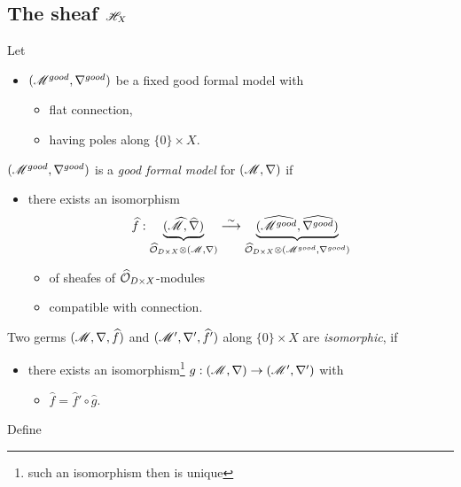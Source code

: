 \subsection{The sheaf $\mathscr{H}_X$}
\begin{defn}
  Let
  \begin{itemize}
    \item $(\mathscr{M}^{good},\nabla^{good})$ be a fixed good formal model with
      \begin{itemize}
        \item flat connection,
        \item having poles along $\{0\}\times X$.
      \end{itemize}
  \end{itemize}
  \begin{defn}
    $(\mathscr{M}^{good},\nabla^{good})$ is a \emph{good formal model} for
    $(\mathscr{M},\nabla)$ if
    \begin{itemize}
      \item there exists an isomorphism
        \[
          \widehat f:
          \underset{\widehat{\mathcal{O}}_{D\times X}\otimes(\mathscr{M},\nabla)}
          {\underbrace{(\widehat{\mathscr{M}},\widehat\nabla)}}
          \overset{\sim}{\longrightarrow}
          \underset{\widehat{\mathcal{O}}_{D\times X}\otimes(\mathscr{M}^{good},\nabla^{good})}
          {\underbrace{(\widehat{\mathscr{M}^{good}},\widehat{\nabla^{good}})}}
        \]
        \begin{itemize}
          \item of sheafes of $\widehat{\mathcal{O}}_{D\times X}$-modules
          \item compatible with connection.
        \end{itemize}
    \end{itemize}
  \end{defn}
  \begin{defn}
    Two germs $(\mathscr{M},\nabla,\widehat f)$ and $(\mathscr{M}',\nabla',\widehat f')$ along
    $\{0\}\times X$ are \emph{isomorphic}, if
    \begin{itemize}
      \item there exists an isomorphism\footnote{such an isomorphism then is
        unique} $g:(\mathscr{M},\nabla)\to(\mathscr{M}',\nabla')$ with
        \begin{itemize}
          \item $\hat f=\hat f'\circ\hat g$.
        \end{itemize}
    \end{itemize}
  \end{defn}
  Define
  \begin{itemize}

\end{itemize}
\end{defn}

